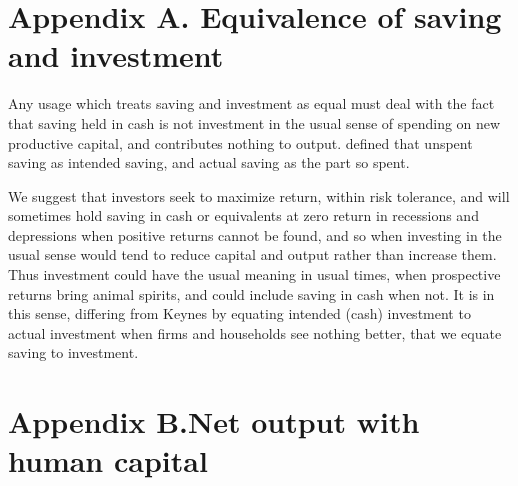 \documentclass[a4paper,fleqn]{latex_styles/cas-sc}
\begin{document}
\appendix
\renewcommand{\theequation}{A.\arabic{equation}}
\setcounter{equation}{0}

\hypertarget{appendix-a}{
\section*{Appendix A. \hspace{0.5em}Equivalence of saving and investment}\label{appendix-a}
}

Any usage which treats saving and investment as equal must deal with the fact that saving held in cash is not investment in the usual sense of spending on new productive capital, and contributes nothing to output. \cite{keynesGeneralTheoryEmployment1936} defined that unspent saving as intended saving, and actual saving as the part so spent.

We suggest that investors seek to maximize return, within risk tolerance, and will sometimes hold saving in cash or equivalents at zero return in recessions and depressions when positive returns cannot be found, and so when investing in the usual sense would tend to reduce capital and output rather than increase them. Thus investment could have the usual meaning in usual times, when prospective returns bring animal spirits, and could include saving in cash when not. It is in this sense, differing from Keynes by equating intended (cash) investment to actual investment when firms and households see nothing better, that we equate saving to investment.

\renewcommand{\theequation}{B.\arabic{equation}}
\setcounter{equation}{0}

\hypertarget{appendix}{%
\section*{Appendix B.\hspace{0.5em}Net output with human
capital}\label{appendix}}
\end{document}
